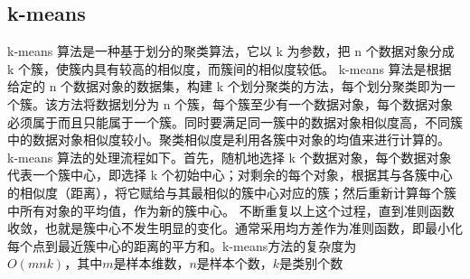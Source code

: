 \documentclass[a4paper,11pt,UTF8]{ctexart}
\begin{document}
\subsection{k-means}
k-means 算法是一种基于划分的聚类算法，它以 k 为参数，把 n 个数据对象分成 k 个簇，使簇内具有较高的相似度，而簇间的相似度较低。 
k-means 算法是根据给定的 n 个数据对象的数据集，构建 k 个划分聚类的方法，每个划分聚类即为一个簇。该方法将数据划分为 n 个簇，每个簇至少有一个数据对象，每个数据对象必须属于而且只能属于一个簇。同时要满足同一簇中的数据对象相似度高，不同簇中的数据对象相似度较小。聚类相似度是利用各簇中对象的均值来进行计算的。
k-means 算法的处理流程如下。首先，随机地选择 k 个数据对象，每个数据对象代表一个簇中心，即选择 k 个初始中心；对剩余的每个对象，根据其与各簇中心的相似度（距离），将它赋给与其最相似的簇中心对应的簇；然后重新计算每个簇中所有对象的平均值，作为新的簇中心。
不断重复以上这个过程，直到准则函数收敛，也就是簇中心不发生明显的变化。通常采用均方差作为准则函数，即最小化每个点到最近簇中心的距离的平方和。k-means方法的复杂度为$O(mnk)，其中m是样本维数，n是样本个数，k是类别个数$
\end{document}
